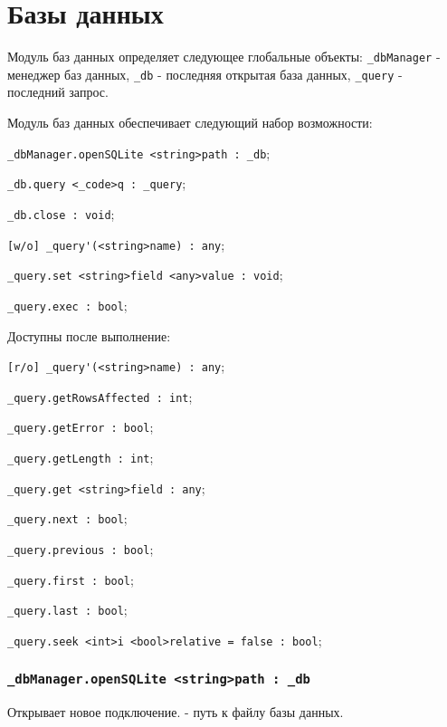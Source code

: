 \section{Базы данных}

Модуль баз данных определяет следующее глобальные объекты: \lstinline|_dbManager| - менеджер баз данных, \lstinline|_db| - последняя открытая база данных, \lstinline|_query| - последний запрос.

Модуль баз данных обеспечивает следующий набор возможности:
\begin{icItems}
	\item \lstinline|_dbManager.openSQLite <string>path : _db|;
	\item \lstinline|_db.query <_code>q : _query|;
	\item \lstinline|_db.close : void|;
	\item \lstinline|[w/o] _query'(<string>name) : any|;
	\item \lstinline|_query.set <string>field <any>value : void|;
	\item \lstinline|_query.exec : bool|;
	\item Доступны после выполнение:
	\begin{icItems}
		\item \lstinline|[r/o] _query'(<string>name) : any|;
		\item \lstinline|_query.getRowsAffected : int|;
		\item \lstinline|_query.getError : bool|;
		\item \lstinline|_query.getLength : int|;
		\item \lstinline|_query.get <string>field : any|;
		\item \lstinline|_query.next : bool|;
		\item \lstinline|_query.previous : bool|;
		\item \lstinline|_query.first : bool|;
		\item \lstinline|_query.last : bool|;
		\item \lstinline|_query.seek <int>i <bool>relative = false : bool|;
	\end{icItems}
\end{icItems}

\subsubsection{\lstinline|_dbManager.openSQLite <string>path : _db|}

Открывает новое подключение.  - путь к файлу базы данных.

